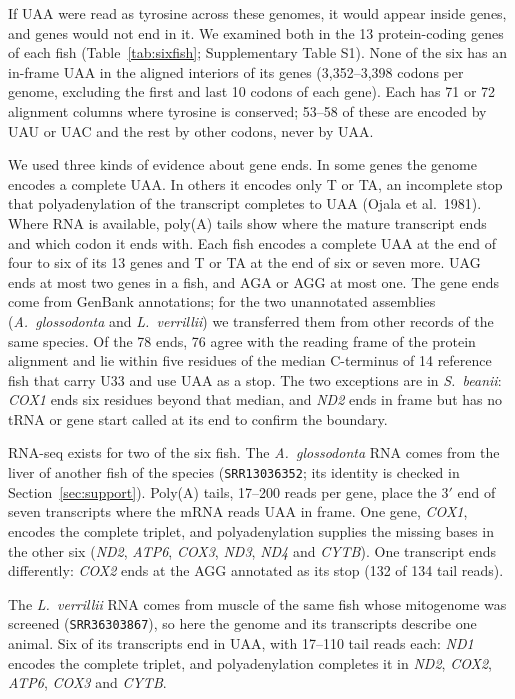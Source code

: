 \documentclass[11pt, a4paper]{article}
\begin{document}
If UAA were read as tyrosine across these genomes, it would appear inside genes, and genes would not end in it. We examined both in the 13 protein-coding genes of each fish (Table~\ref{tab:sixfish}; Supplementary Table S1). None of the six has an in-frame UAA in the aligned interiors of its genes (3,352--3,398 codons per genome, excluding the first and last 10 codons of each gene). Each has 71 or 72 alignment columns where tyrosine is conserved; 53--58 of these are encoded by UAU or UAC and the rest by other codons, never by UAA.

We used three kinds of evidence about gene ends. In some genes the genome encodes a complete UAA. In others it encodes only T or TA, an incomplete stop that polyadenylation of the transcript completes to UAA (Ojala et al.\ 1981). Where RNA is available, poly(A) tails show where the mature transcript ends and which codon it ends with. Each fish encodes a complete UAA at the end of four to six of its 13 genes and T or TA at the end of six or seven more. UAG ends at most two genes in a fish, and AGA or AGG at most one. The gene ends come from GenBank annotations; for the two unannotated assemblies (\textit{A.\ glossodonta} and \textit{L.\ verrillii}) we transferred them from other records of the same species. Of the 78 ends, 76 agree with the reading frame of the protein alignment and lie within five residues of the median C-terminus of 14 reference fish that carry U33 and use UAA as a stop. The two exceptions are in \textit{S.\ beanii}: \textit{COX1} ends six residues beyond that median, and \textit{ND2} ends in frame but has no tRNA or gene start called at its end to confirm the boundary.

RNA-seq exists for two of the six fish. The \textit{A.\ glossodonta} RNA comes from the liver of another fish of the species (\texttt{SRR13036352}; its identity is checked in Section~\ref{sec:support}). Poly(A) tails, 17--200 reads per gene, place the 3$'$ end of seven transcripts where the mRNA reads UAA in frame. One gene, \textit{COX1}, encodes the complete triplet, and polyadenylation supplies the missing bases in the other six (\textit{ND2}, \textit{ATP6}, \textit{COX3}, \textit{ND3}, \textit{ND4} and \textit{CYTB}). One transcript ends differently: \textit{COX2} ends at the AGG annotated as its stop (132 of 134 tail reads).

The \textit{L.\ verrillii} RNA comes from muscle of the same fish whose mitogenome was screened (\texttt{SRR36303867}), so here the genome and its transcripts describe one animal. Six of its transcripts end in UAA, with 17--110 tail reads each: \textit{ND1} encodes the complete triplet, and polyadenylation completes it in \textit{ND2}, \textit{COX2}, \textit{ATP6}, \textit{COX3} and \textit{CYTB}.
\end{document}
